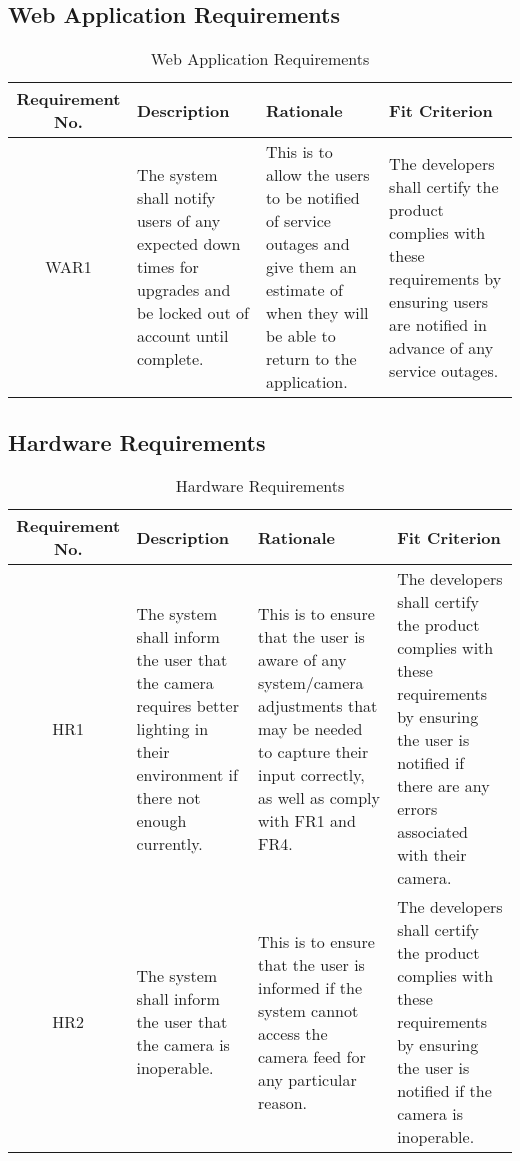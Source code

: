 \documentclass{article}
\begin{document}
\subsection{Web Application Requirements}

\begin{longtable}{| c | p{4cm}| p{4cm}| p{4cm}|}
    \caption{Web Application Requirements} \\
    \hline
    \textbf{Requirement No.} & \textbf{Description} &\textbf{Rationale} &\textbf{Fit Criterion}\\
    \hline
    WAR1 & The system shall notify users of any expected down times for upgrades and be locked out of account until complete. & This is to allow the users to be notified of service outages and give them an estimate of when they will be able to return to the application. & The developers shall certify the product complies with these requirements by ensuring users are notified in advance of any service outages.\\
    \bottomrule
\end{longtable}

\subsection{Hardware Requirements}

\begin{longtable}{| c | p{4cm}| p{4cm}| p{4cm}|}
    \caption{Hardware Requirements} \\
    \hline
    \textbf{Requirement No.} & \textbf{Description} &\textbf{Rationale} &\textbf{Fit Criterion}\\
    \hline
    HR1 & The system shall inform the user that the camera requires better lighting in their environment if there not enough currently. & This is to ensure that the user is aware of any system/camera adjustments that may be needed to capture their input correctly, as well as comply with FR1 and FR4. & The developers shall certify the product complies with these requirements by ensuring the user is notified if there are any errors associated with their camera.\\
    \hline
    HR2 & The system shall inform the user that the camera is inoperable. & This is to ensure that the user is informed if the system cannot access the camera feed for any particular reason. & The developers shall certify the product complies with these requirements by ensuring the user is notified if the camera is inoperable. \\
    \bottomrule
\end{longtable}
\end{document}
